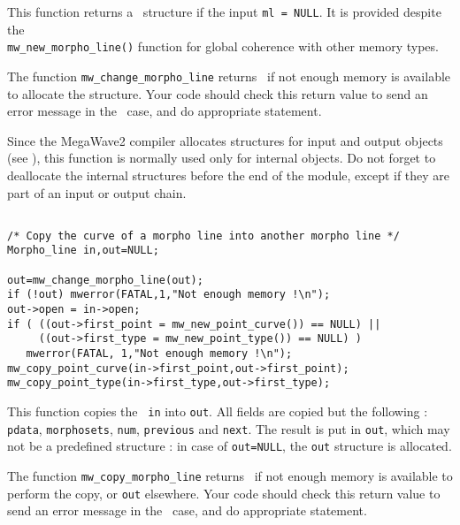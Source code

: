 \Description
This function returns a \mline\ structure if the input \verb+ml = NULL+.
It is provided despite the \\
\verb+mw_new_morpho_line()+ function for
global coherence with other memory types.

The function \verb+mw_change_morpho_line+ returns \Null\ if not enough memory is available to allocate the structure. 
Your code should check this return value to send an error message in the \Null\ case, and do appropriate statement.

Since the MegaWave2 compiler allocates structures for input and output 
objects (see \volI), this function is normally used only for internal objects.
Do not forget to deallocate the internal structures before the end
of the module, except if they are part of an input or output chain.

\Next
\Example
\begin{verbatim}

/* Copy the curve of a morpho line into another morpho line */
Morpho_line in,out=NULL;

out=mw_change_morpho_line(out);
if (!out) mwerror(FATAL,1,"Not enough memory !\n");
out->open = in->open;
if ( ((out->first_point = mw_new_point_curve()) == NULL) ||
     ((out->first_type = mw_new_point_type()) == NULL) )
   mwerror(FATAL, 1,"Not enough memory !\n");
mw_copy_point_curve(in->first_point,out->first_point);
mw_copy_point_type(in->first_type,out->first_type);

\end{verbatim}

\newpage %


\Description
This function copies the \mline\ \verb+in+ into \verb+out+.
All fields are copied but the following : \verb+pdata+, \verb+morphosets+,
\verb+num+, \verb+previous+ and \verb+next+.
The result is put in \verb+out+, which may not be a predefined structure : in case 
of \verb+out=NULL+, the \verb+out+ structure is allocated.

The function \verb+mw_copy_morpho_line+ returns \Null\ if not enough memory is available to perform
the copy, or \verb+out+ elsewhere.
Your code should check this return value to send an error message in the \Null\ case, and do appropriate statement.

